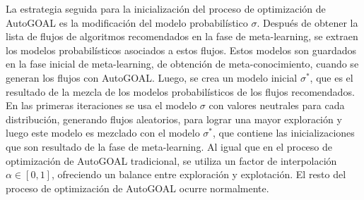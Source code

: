 La estrategia seguida para la inicialización del proceso de optimización de AutoGOAL es la modificación del modelo probabilístico $\sigma$. Después de obtener la lista de flujos de algoritmos recomendados en la fase de meta-learning, se extraen los modelos probabilísticos asociados a estos flujos. Estos modelos son guardados en la fase inicial de meta-learning, de obtención de meta-conocimiento, cuando se generan los flujos con AutoGOAL. Luego, se crea un modelo inicial $\sigma^*$, que es el resultado de la mezcla de los modelos probabilísticos de los flujos recomendados. En las primeras iteraciones se usa el modelo $\sigma$ con valores neutrales para cada distribución, generando flujos aleatorios, para lograr una mayor exploración y luego este modelo es mezclado con el modelo $\sigma^*$, que contiene las inicializaciones que son resultado de la fase de meta-learning. Al igual que en el proceso de optimización de AutoGOAL tradicional, se utiliza un factor de interpolación $\alpha \in [0, 1]$, ofreciendo un balance entre exploración y explotación. El resto del proceso de optimización de AutoGOAL ocurre normalmente.

